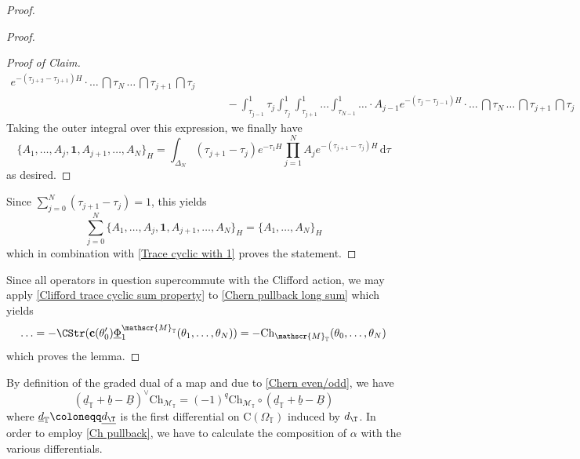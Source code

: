 \documentclass[a4paper, english, 12pt, bibliography=totocnumbered,
index=totoc]{scrartcl}
\begin{document}
\begin{proof}
\begin{proof}
\begin{proof}[Proof of Claim]
\begin{align*}
				e^{-(\tau_{j+2}
					- \tau_{j+1})H} \cdot \ldots \, \dint \tau_{N} \, \ldots
				\, \dint \tau_{j+1} \, \dint \tau_j \\
				& \qquad - \int_{\tau_{j-1}}^1 \tau_{j} \int_{\tau_{j}}^1
				\int_{\tau_{j+1}}^1 \ldots
				\int_{\tau_{N-1}}^1 \ldots \cdot A_{j-1}e^{-(\tau_{j} -
					\tau_{j-1})H} \cdot \ldots
				\, \dint \tau_{N} \, \ldots \, \dint \tau_{j+1} \, \dint
				\tau_{j}
			\end{align*}
			\normalsize
			Taking the outer integral over this expression, we finally have
			\begin{equation}\label{Pulling out 1}
				\{A_1, \ldots, A_j, \mathbf{1}, A_{j+1}, \ldots, A_N\}_H =
				\int_{\Delta_N} (\tau_{j+1} - \tau_j) e^{-\tau_1 H}
				\prod_{j=1}^{N}
				A_j e^{-(\tau_{j+1} - \tau_j)H} \, \mathrm{d} \tau
			\end{equation}
			as desired.
		\end{proof}
		Since $\sum_{j=0}^{N} (\tau_{j+1} - \tau_j) = 1$, this yields
		\begin{equation*}
			\sum_{j = 0}^N \{A_1, \ldots, A_j, \mathbf{1}, A_{j+1}, \ldots,
			A_N\}_H
			= \{A_1, \ldots, A_N\}_H
		\end{equation*}
		which in combination with \cref{Trace cyclic with 1} proves the
		statement.
	\end{proof}
	Since all operators in question supercommute with the Clifford action,
	we may apply \cref{Clifford trace cyclic sum property} to \cref{Chern
		pullback long sum} which yields
	\begin{equation*}
		\ldots = - \CStr(\mathbf{c}(\theta_0')
		\underline{\Phi}_1^{\mathscr{M}_{\mathbb{T}}}(\theta_1, \ldots,
		\theta_N)) = -
		\mathrm{Ch}_{\mathscr{M}_{\mathbb{T}}}(\theta_0,
		\ldots, \theta_N)
	\end{equation*}
	which proves the lemma.
\end{proof}
By definition of the graded dual of a map and due to \cref{Chern even/odd},
we have
\begin{equation*}
	(\underline{d}_{\mathbb{T}} + \underline{b} - \underline{B})^{\vee}
	\mathrm{Ch}_{\mathscr{M}_{\mathbb{T}}} = (-1)^q
	\mathrm{Ch}_{\mathscr{M}_{\mathbb{T}}} \circ
	(\underline{d}_{\mathbb{T}} + \underline{b} - \underline{B})
\end{equation*}
where $\underline{d}_{\mathbb{T}} \coloneqq \underline{d_{\T}}$ is the
first differential on $\mathrm{C}(\Omega_{\mathbb{T}})$ induced by $d_\T$.
In order to employ \cref{Ch pullback}, we have to calculate the composition
of $\alpha$ with the various differentials.
\end{document}
